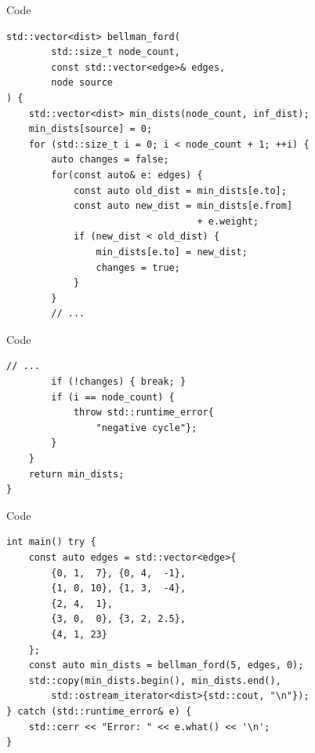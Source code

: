 \begin{frame}[fragile]{Code}

\begin{lstlisting}[basicstyle=\footnotesize]
std::vector<dist> bellman_ford(
        std::size_t node_count,
        const std::vector<edge>& edges,
        node source
) {
    std::vector<dist> min_dists(node_count, inf_dist);
    min_dists[source] = 0;
    for (std::size_t i = 0; i < node_count + 1; ++i) {
        auto changes = false;
        for(const auto& e: edges) {
            const auto old_dist = min_dists[e.to];
            const auto new_dist = min_dists[e.from]
                                  + e.weight;
            if (new_dist < old_dist) {
                min_dists[e.to] = new_dist;
                changes = true;
            }
        }
        // ...
\end{lstlisting}


\end{frame}

\begin{frame}[fragile]{Code}

\begin{lstlisting}[basicstyle=\footnotesize]
        // ...
        if (!changes) { break; }
        if (i == node_count) {
            throw std::runtime_error{
                "negative cycle"};
        }
    }
    return min_dists;
}
\end{lstlisting}

\end{frame}

\begin{frame}[fragile]{Code}

\begin{lstlisting}[basicstyle=\footnotesize]
int main() try {
    const auto edges = std::vector<edge>{
        {0, 1,  7}, {0, 4,  -1},
        {1, 0, 10}, {1, 3,  -4},
        {2, 4,  1},
        {3, 0,  0}, {3, 2, 2.5},
        {4, 1, 23}
    };
    const auto min_dists = bellman_ford(5, edges, 0);
    std::copy(min_dists.begin(), min_dists.end(),
        std::ostream_iterator<dist>{std::cout, "\n"});
} catch (std::runtime_error& e) {
    std::cerr << "Error: " << e.what() << '\n';
}
\end{lstlisting}

\end{frame}


